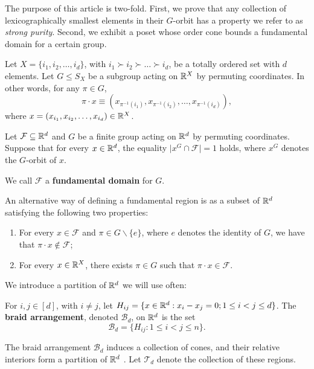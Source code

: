 The purpose of this article is two-fold. First, we prove that any collection of lexicographically smallest elements in their \(G\)-orbit has a property we refer to as \textit{strong purity}. Second, we exhibit a poset whose order cone bounds a fundamental domain for a certain group.

Let $X = \{i_1, i_2, \dots , i_d\}$, with $i_1 \succ i_2 \succ \dots \succ i_d$, be a totally ordered set with $d$ elements. Let  $G \le S_X$ be a subgroup acting on $\mathbb{R}^X$ by permuting coordinates. In other words, for any $\pi \in G$, \[\pi \cdot x \equiv (x_{\pi^{-1}(i_1)}, x_{\pi^{-1}(i_2)}, \dots , x_{\pi^{-1}(i_d)}),\] where $x = (x_{i_1}, x_{i_2}, \dots , x_{i_d})\in\mathbb{R}^X$.

\begin{defn}
Let $\mathcal{F} \subseteq \mathbb{R}^d$ and $G$ be a finite group acting on $\mathbb{R}^d$ by permuting coordinates. Suppose that for every $x\in\mathbb{R}^d$, the equality $\vert x^G \cap \mathcal{F}\vert = 1$ holds, where \(x^G\) denotes the \(G\)-orbit of \(x\).

We call $\mathcal{F}$ a \textbf{fundamental domain} for \(G\).
\end{defn}

An alternative way of defining a fundamental region is as a subset of $\mathbb{R}^d$ satisfying the following two properties: \begin{enumerate}
\item For every $x\in\mathcal{F}$ and $\pi \in G\backslash\{e\}$, where $e$ denotes the identity of $G$, we have that $\pi \cdot x \notin \mathcal{F}$;
\item For every $x\in\mathbb{R}^X$, there exists $\pi \in G$ such that $\pi \cdot x \in \mathcal{F}$.
\end{enumerate} %

We introduce a partition of $\mathbb{R}^d$ we will use often:

\begin{defn}
For $i, j \in [d]$, with $i \neq j$, let $H_{ij} = \{x\in\mathbb{R}^d : x_i - x_j = 0; 1 \le i < j \le d \}$. The \textbf{braid arrangement}, denoted $\mathcal{B}_d$, on $\mathbb{R}^d$ is the set \[\mathcal{B}_d = \{H_{ij} : 1 \le i < j \le n \}.\]
\end{defn}

The braid arrangement $\mathcal{B}_d$ induces a collection of cones, and their relative interiors form a partition of $\mathbb{R}^d$ \cite[p. 192]{ziegler}. Let $\mathcal{T}_d$ denote the collection of these regions.


